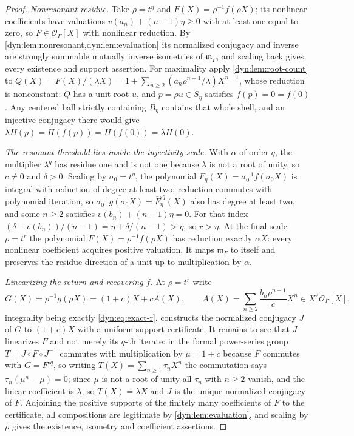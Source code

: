 \documentclass[11pt,letterpaper]{article}
\theoremstyle{definition}
\theoremstyle{remark}
\newcommand{\OO}{\mathcal O}
\newcommand{\m}{\mathfrak m}
\numberwithin{equation}{section}
\begin{document}
\begin{proof}
\emph{Nonresonant residue.} Take $\rho=t^{\eta}$ and
$F(X)=\rho^{-1}f(\rho X)$; its nonlinear coefficients have valuations
$v(a_n)+(n-1)\eta\ge0$ with at least one equal to zero, so
$F\in\OO_\Gamma[X]$ with nonlinear reduction. By
\cref{dyn:lem:nonresonant,dyn:lem:evaluation} its normalized conjugacy and
inverse are strongly summable mutually inverse isometries of $\m_\Gamma$,
and scaling back gives every existence and support assertion. For
maximality apply \cref{dyn:lem:root-count} to
$Q(X)=F(X)/(\lambda X)=1+\sum_{n\ge2}(a_n\rho^{n-1}/\lambda)X^{n-1}$,
whose reduction is nonconstant: $Q$ has a unit root $u$, and
$p=\rho u\in S_\eta$ satisfies $f(p)=0=f(0)$. Any centered ball strictly
containing $B_\eta$ contains that whole shell, and an injective conjugacy
there would give $\lambda H(p)=H(f(p))=H(f(0))=\lambda H(0)$.

\emph{The resonant threshold lies inside the injectivity scale.} With
$\alpha$ of order $q$, the multiplier $\lambda^{q}$ has residue one and is
not one because $\lambda$ is not a root of unity, so $c\ne0$ and
$\delta>0$. Scaling by $\sigma_0=t^{\eta}$, the polynomial
$F_\eta(X)=\sigma_0^{-1}f(\sigma_0X)$ is integral with reduction of degree
at least two; reduction commutes with polynomial iteration, so
$\overline{\sigma_0^{-1}g(\sigma_0X)}=\bar F_\eta^{\circ q}(X)$ also has
degree at least two, and some $n\ge2$ satisfies $v(b_n)+(n-1)\eta=0$. For
that index $(\delta-v(b_n))/(n-1)=\eta+\delta/(n-1)>\eta$, so
$r>\eta$. At the final scale $\rho=t^{r}$ the polynomial
$F(X)=\rho^{-1}f(\rho X)$ has reduction exactly $\alpha X$: every nonlinear
coefficient acquires positive valuation. It maps $\m_\Gamma$ to itself and
preserves the residue direction of a unit up to multiplication by $\alpha$.

\emph{Linearizing the return and recovering $f$.} At $\rho=t^{r}$ write
\begin{equation}\label{dyn:eq:G}
 G(X)=\rho^{-1}g(\rho X)=(1+c)X+cA(X),\qquad
 A(X)=\sum_{n\ge2}\frac{b_n\rho^{n-1}}{c}X^{n}\in X^{2}\OO_\Gamma[X],
\end{equation}
integrality being exactly \eqref{dyn:eq:exact-r}.
 constructs the normalized conjugacy $J$ of $G$
to $(1+c)X$ with a uniform support certificate. It remains to see that $J$
linearizes $F$ and not merely its $q$-th iterate: in the formal
power-series group $T=J\circ F\circ J^{-1}$ commutes with multiplication by
$\mu=1+c$ because $F$ commutes with $G=F^{\circ q}$, so writing
$T(X)=\sum_{n\ge1}\tau_nX^{n}$ the commutation says
$\tau_n(\mu^{n}-\mu)=0$; since $\mu$ is not a root of unity all $\tau_n$
with $n\ge2$ vanish, and the linear coefficient is $\lambda$, so
$T(X)=\lambda X$ and $J$ is the unique normalized conjugacy of $F$.
Adjoining the positive supports of the finitely many coefficients of $F$ to
the certificate, all compositions are legitimate by
\cref{dyn:lem:evaluation}, and scaling by $\rho$ gives the existence,
isometry and coefficient assertions.


\end{proof}
\end{document}
